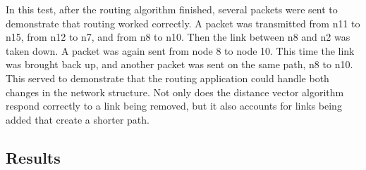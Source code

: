 \documentclass[fleqn,11pt]{article}
\begin{document}
	In this test, after the routing algorithm finished, several packets were sent to demonstrate that
	routing worked correctly. A packet was transmitted from n11 to n15, from n12 to n7, and from n8 to n10.
	Then the link between n8 and n2 was taken down. A packet was again sent from node 8 to node 10. This time
	the link was brought back up, and another packet was sent on the same path, n8 to n10. This served
	to demonstrate that the routing application could handle both changes in the network structure. Not
	only does the distance vector algorithm respond correctly to a link being removed, but it also accounts
	for links being added that create a shorter path.
	
	\subsection{Results}
	
\end{document}

